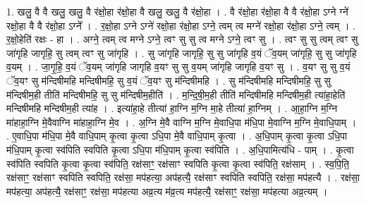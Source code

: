 \documentclass[17pt]{extarticle}
\begin{document}
1. खलु॒ वै वै खलु॒ खलु॒ वै र॑क्षो॒हा र॑क्षो॒हा वै खलु॒ खलु॒ वै र॑क्षो॒हा । . वै र॑क्षो॒हा र॑क्षो॒हा वै वै र॑क्षो॒हा ऽग्ने ग्ने॑ रक्षो॒हा वै वै र॑क्षो॒हा ऽग्ने᳚ । . र॒क्षो॒हा ऽग्ने ऽग्ने॑ रक्षो॒हा र॑क्षो॒हा ऽग्ने॒ त्वम् त्व मग्ने॑ रक्षो॒हा र॑क्षो॒हा ऽग्ने॒ त्वम् । . र॒क्षो॒हेति॑ रक्षः - हा । . अग्ने॒ त्वम् त्व मग्ने ऽग्ने॒ त्वꣳ सु सु त्व मग्ने ऽग्ने॒ त्वꣳ सु । . त्वꣳ सु सु त्वम् त्वꣳ सु जा॑गृहि जागृहि॒ सु त्वम् त्वꣳ सु जा॑गृहि । . सु जा॑गृहि जागृहि॒ सु सु जा॑गृहि व॒यं ॅव॒यम् जा॑गृहि॒ सु सु जा॑गृहि व॒यम् । . जा॒गृ॒हि॒ व॒यं ॅव॒यम् जा॑गृहि जागृहि व॒यꣳ सु सु व॒यम् जा॑गृहि जागृहि व॒यꣳ सु । . व॒यꣳ सु सु व॒यं ॅव॒यꣳ सु म॑न्दिषीमहि मन्दिषीमहि॒ सु व॒यं ॅव॒यꣳ सु म॑न्दिषीमहि । . सु म॑न्दिषीमहि मन्दिषीमहि॒ सु सु म॑न्दिषीम॒ही तीति॑ मन्दिषीमहि॒ सु सु म॑न्दिषीम॒हीति॑ । . म॒न्दि॒षी॒म॒ही तीति॑ मन्दिषीमहि मन्दिषीम॒ही त्या॑हा॒हेति॑ मन्दिषीमहि मन्दिषीम॒ही त्या॑ह । . इत्या॑हा॒हे तीत्या॑ हा॒ग्नि म॒ग्नि मा॒हे तीत्या॑ हा॒ग्निम् । . आ॒हा॒ग्नि म॒ग्नि मा॑हाहा॒ग्नि मे॒वैवाग्नि मा॑हाहा॒ग्नि मे॒व । . अ॒ग्नि मे॒वै वाग्नि म॒ग्नि मे॒वाधि॒पा म॑धि॒पा मे॒वाग्नि म॒ग्नि मे॒वाधि॒पाम् । . ए॒वाधि॒पा म॑धि॒पा मे॒वै वाधि॒पाम् कृ॒त्वा कृ॒त्वा ऽधि॒पा मे॒वै वाधि॒पाम् कृ॒त्वा । . अ॒धि॒पाम् कृ॒त्वा कृ॒त्वा ऽधि॒पा म॑धि॒पाम् कृ॒त्वा स्व॑पिति स्वपिति कृ॒त्वा ऽधि॒पा म॑धि॒पाम् कृ॒त्वा स्व॑पिति । . अ॒धि॒पामित्य॑धि - पाम् । . कृ॒त्वा स्व॑पिति स्वपिति कृ॒त्वा कृ॒त्वा स्व॑पिति॒ रक्ष॑साꣳ॒॒ रक्ष॑साꣳ स्वपिति कृ॒त्वा कृ॒त्वा स्व॑पिति॒ रक्ष॑साम् । . स्व॒पि॒ति॒ रक्ष॑साꣳ॒॒ रक्ष॑साꣳ स्वपिति स्वपिति॒ रक्ष॑सा॒ मप॑हत्या॒ अप॑हत्यै॒ रक्ष॑साꣳ स्वपिति स्वपिति॒ रक्ष॑सा॒ मप॑हत्यै । . रक्ष॑सा॒ मप॑हत्या॒ अप॑हत्यै॒ रक्ष॑साꣳ॒॒ रक्ष॑सा॒ मप॑हत्या अव्र॒त्य म॑व्र॒त्य मप॑हत्यै॒ रक्ष॑साꣳ॒॒ रक्ष॑सा॒ मप॑हत्या अव्र॒त्यम् । \newline
\end{document}
